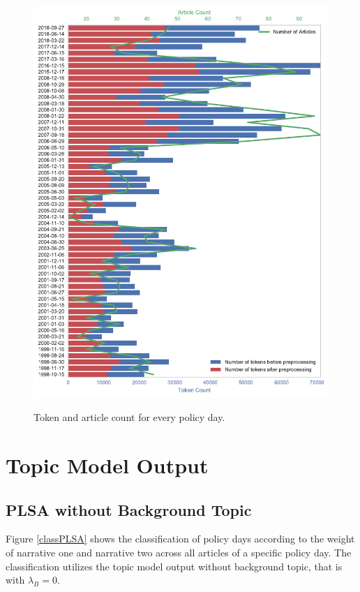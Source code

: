 \documentclass[11pt,a4paper,english,oneside]{book}
\numberwithin{equation}{chapter}
\begin{document}
\begin{figure}
	\caption{Token and article count for every policy day.}
	\centering
	\includegraphics[scale=1]{Images/tokencount.pdf}
	\label{tokencount}
\end{figure}

\renewcommand{\theequation}{C.\arabic{equation}}


\chapter{Topic Model Output}\label{AppendixC}

\section{PLSA without Background Topic}\label{AppendixC1}

Figure \ref{classPLSA} shows the classification of policy days according to the weight of narrative one and narrative two across all articles of a specific policy day. The classification utilizes the topic model output without background topic, that is with $\lambda_B = 0$. 
\end{document}
